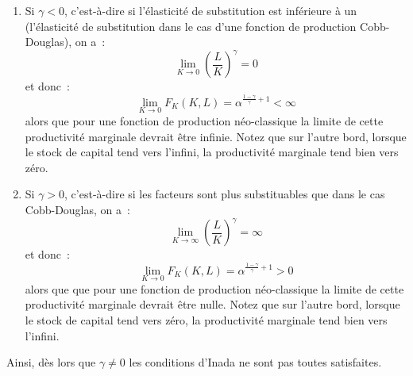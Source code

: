 \documentclass[10pt,a4paper,notitlepage]{report}
\begin{document}
\begin{enumerate}
\item Si $\gamma<0$, c'est-à-dire  si l'élasticité de substitution est
  inférieure  à un  (l'élasticité de  substitution dans  le cas  d'une
  fonction de production Cobb-Douglas), on a :
  \[
  \lim_{K\rightarrow 0} \left(\frac{L}{K}\right)^{\gamma} = 0
  \]
  et donc :
  \[
  \lim_{K\rightarrow 0} F_K(K,L) = \alpha^{\frac{1-\gamma}{\gamma}+1} < \infty
  \]
  alors que pour une fonction de production néo-classique la limite de
  cette  productivité marginale  devrait être  infinie. Notez  que sur
  l'autre bord,  lorsque le  stock de capital  tend vers  l'infini, la
  productivité marginale tend bien vers zéro.
\item  Si   $\gamma>0$,  c'est-à-dire   si  les  facteurs   sont  plus
  substituables que dans le cas Cobb-Douglas, on a :
  \[
  \lim_{K\rightarrow \infty} \left(\frac{L}{K}\right)^{\gamma} = \infty
  \]
  et donc :
  \[
  \lim_{K\rightarrow 0} F_K(K,L) = \alpha^{\frac{1-\gamma}{\gamma}+1} > 0
  \]
  alors que que pour une fonction de production néo-classique la limite de
  cette  productivité marginale  devrait être  nulle. Notez  que sur
  l'autre bord,  lorsque le  stock de capital  tend vers  zéro, la
  productivité marginale tend bien vers l'infini.
\end{enumerate}
Ainsi, dès lors que $\gamma\neq 0$  les conditions d'Inada ne sont pas
toutes satisfaites.


\bigskip
\bigskip
\end{document}
